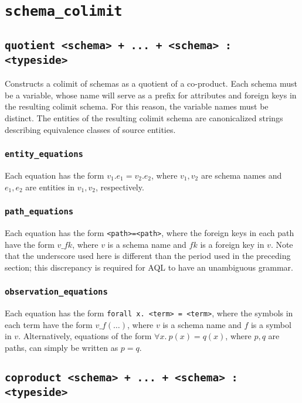 \documentclass[10pt]{book}
\begin{document}
\chapter{{\tt schema\_colimit}}

\section{{\tt quotient <schema> + ... + <schema> : <typeside>}}

Constructs a colimit of schemas as a quotient of a co-product.  Each schema must be a variable, whose name will serve as a prefix for attributes and foreign keys in the resulting colimit schema.  For this reason, the variable names must be distinct.  The entities of the resulting colimit schema are canonicalized strings describing equivalence classes of source entities.

\subsection{{\tt entity\_equations}}

Each equation has the form $v_1.e_1 = v_2.e_2$, where $v_1, v_2$ are schema names and $e_1, e_2$ are entities in $v_1, v_2$, respectively.

\subsection{{\tt path\_equations}}

Each equation has the form {\tt <path>=<path>}, where the foreign keys in each path have the form $v\_fk$, where $v$ is a schema name and $fk$ is a foreign key in $v$.  Note that the underscore used here is different than the period used in the preceding section; this discrepancy is required for AQL to have an unambiguous grammar.

\subsection{{\tt observation\_equations}}

Each equation has the form {\tt forall x. <term> = <term>}, where the symbols in each term have the form $v\_f(\ldots)$, where $v$ is a schema name and $f$ is a symbol in $v$.   Alternatively, equations of the form $\forall x. \ p(x) = q(x)$, where $p,q$ are paths, can simply be written as $p = q$.

\section{{\tt coproduct <schema> + ... + <schema> : <typeside>}}
\end{document}
